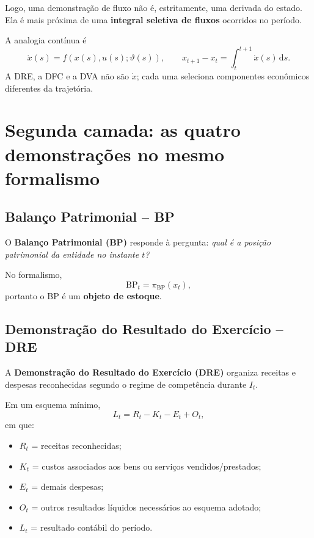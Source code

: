 \documentclass[11pt,a4paper]{article}
\newcommand{\BP}{\mathrm{BP}}
\newcommand{\dd}{\,\mathrm{d}}
\begin{document}
Logo, uma demonstração de fluxo não é, estritamente, uma derivada do estado. Ela é mais próxima de uma \textbf{integral seletiva de fluxos} ocorridos no período.

\begin{formalizacao}
A analogia contínua é
\[
\dot x(s)=f(x(s),u(s);\vartheta(s)),
\qquad
x_{t+1}-x_t=\int_t^{t+1}\dot x(s)\dd s.
\]
A DRE, a DFC e a DVA não são $\dot x$; cada uma seleciona componentes econômicos diferentes da trajetória.
\end{formalizacao}

\section{Segunda camada: as quatro demonstrações no mesmo formalismo}

\subsection{Balanço Patrimonial -- BP}

O \textbf{Balanço Patrimonial (BP)} responde à pergunta: \emph{qual é a posição patrimonial da entidade no instante $t$?}

No formalismo,
\[
\BP_t=\pi_{\BP}(x_t),
\]
portanto o BP é um \textbf{objeto de estoque}.

\subsection{Demonstração do Resultado do Exercício -- DRE}

A \textbf{Demonstração do Resultado do Exercício (DRE)} organiza receitas e despesas reconhecidas segundo o regime de competência durante $I_t$.

Em um esquema mínimo,
\begin{equation}
\boxed{L_t=R_t-K_t-E_t+O_t,}
\label{eq:dre-simplificada}
\end{equation}
em que:
\begin{itemize}
    \item $R_t$ = receitas reconhecidas;
    \item $K_t$ = custos associados aos bens ou serviços vendidos/prestados;
    \item $E_t$ = demais despesas;
    \item $O_t$ = outros resultados líquidos necessários ao esquema adotado;
    \item $L_t$ = resultado contábil do período.
\end{itemize}
\end{document}
